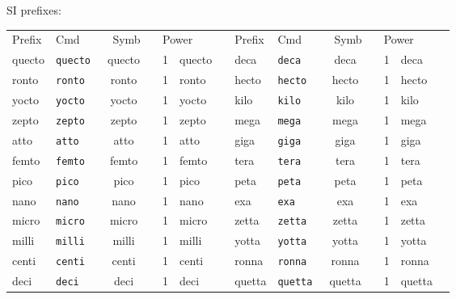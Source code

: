 \documentclass{article}
\def\Backslash{\copy\slashbox}
\begin{document}
\newcommand{\showprefix}[1]{
  #1 & \texttt{\Backslash#1} & \unit{ \csname #1\endcsname \noop } &
  \qty[prefix-mode=extract-exponent, print-unity-mantissa=false]{1}{\csname#1\endcsname\noop}%
}

SI prefixes:
\begin{center}
\begin{tabular}{@{}llcl llcl@{}}\toprule
Prefix & Cmd & Symb & Power &
Prefix & Cmd & Symb & Power \\\cmidrule(r){1-4}\cmidrule(l){5-8}
\showprefix{quecto} & \showprefix{deca}\\
\showprefix{ronto}  & \showprefix{hecto}\\
\showprefix{yocto}  & \showprefix{kilo}\\
\showprefix{zepto}  & \showprefix{mega}\\
\showprefix{atto}   & \showprefix{giga}\\
\showprefix{femto}  & \showprefix{tera}\\
\showprefix{pico}   & \showprefix{peta}\\
\showprefix{nano}   & \showprefix{exa}\\
\showprefix{micro}  & \showprefix{zetta}\\
\showprefix{milli}  & \showprefix{yotta}\\
\showprefix{centi}  & \showprefix{ronna}\\
\showprefix{deci}   & \showprefix{quetta}\\\bottomrule
\end{tabular}
\end{center}
\end{document}
